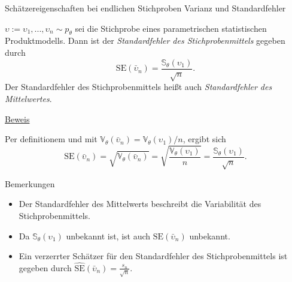 \documentclass[
  8pt,
  ignorenonframetext,
]{beamer}
\providecommand{\tightlist}{%
  \setlength{\itemsep}{0pt}\setlength{\parskip}{0pt}}
\newcommand{\ups} {\upsilon}
\begin{document}
\begin{frame}{\small Schätzereigenschaften bei endlichen Stichproben
\textbar{} Varianz und Standardfehler}
\protect\hypertarget{schuxe4tzereigenschaften-bei-endlichen-stichproben-varianz-und-standardfehler-1}{}
\small
\begin{theorem}
\justifying
\normalfont
$\ups := \ups_1,...,\ups_n \sim p_\theta$ sei die Stichprobe eines parametrischen
statistischen Produktmodells. Dann ist der \textit{Standardfehler des Stichprobenmittels} gegeben durch
\begin{equation}
\mbox{SE}(\bar{\ups}_n) = \frac{\mathbb{S}_\theta(\ups_1)}{\sqrt{n}}.
\end{equation}
Der Standardfehler des Stichprobenmittels heißt auch \textit{Standardfehler des Mittelwertes}.
\end{theorem}

\footnotesize

\underline{Beweis}

Per definitionem und mit
\(\mathbb{V}_\theta(\bar{\ups}_n) = \mathbb{V}_\theta(\ups_1)/n\),
ergibt sich \begin{equation}
\mbox{SE}(\bar{\ups}_n)
= \sqrt{\mathbb{V}_\theta(\bar{\ups}_n)}
= \sqrt{\frac{\mathbb{V}_\theta(\ups_1)}{n}}
= \frac{\mathbb{S}_\theta(\ups_1)}{\sqrt{n}}.
\end{equation}

Bemerkungen

\begin{itemize}
\tightlist
\item
  Der Standardfehler des Mittelwerts beschreibt die Variabilität des
  Stichprobenmittels.
\item
  Da \(\mathbb{S}_\theta(\ups_1)\) unbekannt ist, ist auch
  \(\mbox{SE}(\bar{\ups}_n)\) unbekannt.
\item
  Ein verzerrter Schätzer für den Standardfehler des Stichprobenmittels
  ist gegeben durch
  \(\hat{\mbox{SE}}(\bar{\ups}_n) = \frac{s_n}{\sqrt{n}}\).
\end{itemize}
\end{frame}
\end{document}
